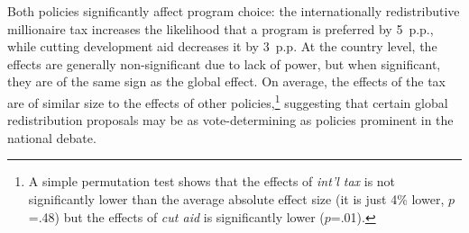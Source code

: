\documentclass[12pt,english]{article}
\begin{document}
\begin{bibunit}
Both policies significantly affect program choice: the internationally redistributive millionaire tax increases the likelihood that a program is preferred by 5~p.p., while cutting development aid decreases it by 3~p.p. At the country level, the effects are generally non-significant due to lack of power, but when significant, they are of the same sign as the global effect. %
On average, the effects of the tax are of similar size to the effects of other policies,\footnote{%
A simple permutation test shows that the effects of \textit{int'l tax} is not significantly lower than the average absolute effect size (it is just 4\% lower, $p$=.48) but the effects of \textit{cut aid} is significantly lower ($p$=.01).
} %
suggesting that certain global redistribution proposals may be as vote-determining as policies prominent in the national debate. %


\end{bibunit}
\end{document}
